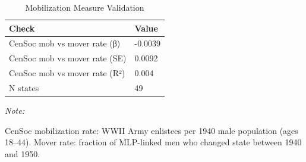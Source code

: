 \begin{table}
\centering
\caption{\label{tab:mobvalidation}Mobilization Measure Validation}
\centering
\begin{threeparttable}
\begin{tabular}[t]{ll}
\toprule
Check & Value\\
\midrule
CenSoc mob vs mover rate (β) & -0.0039\\
CenSoc mob vs mover rate (SE) & 0.0092\\
CenSoc mob vs mover rate (R²) & 0.004\\
N states & 49\\
\bottomrule
\end{tabular}
\begin{tablenotes}
\item \textit{Note: } 
\item CenSoc mobilization rate: WWII Army enlistees per 1940 male population (ages 18--44). Mover rate: fraction of MLP-linked men who changed state between 1940 and 1950.
\end{tablenotes}
\end{threeparttable}
\end{table}
